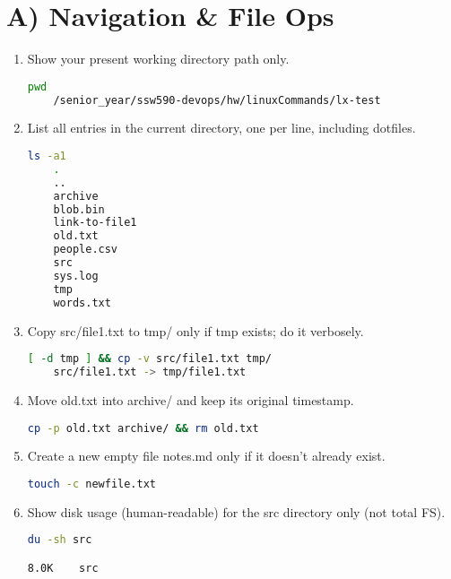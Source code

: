 \section*{A) Navigation \& File Ops}
\begin{enumerate}
\item Show your present working directory path only. \vspace{2em}\\
\begin{lstlisting}[language=sh]
    pwd
    /senior_year/ssw590-devops/hw/linuxCommands/lx-test

\end{lstlisting}

\item List all entries in the current directory, one per line, including dotfiles. \vspace{2em}\\
\begin{lstlisting}[language=sh]
ls -a1
    .
    ..
    archive
    blob.bin
    link-to-file1
    old.txt
    people.csv
    src
    sys.log
    tmp
    words.txt

\end{lstlisting}

\item Copy src/file1.txt to tmp/ only if tmp exists; do it verbosely. \vspace{2em}\\
\begin{lstlisting}[language=sh]
[ -d tmp ] && cp -v src/file1.txt tmp/
    src/file1.txt -> tmp/file1.txt
\end{lstlisting}
\item Move old.txt into archive/ and keep its original timestamp. \vspace{2em}\\
\begin{lstlisting}[language=sh]
cp -p old.txt archive/ && rm old.txt

\end{lstlisting}
\item Create a new empty file notes.md only if it doesn’t already exist. \vspace{2em}\\
\begin{lstlisting}[language=sh]
touch -c newfile.txt

\end{lstlisting}
\item Show disk usage (human-readable) for the src directory only (not total FS). \vspace{2em}\\
\begin{lstlisting}[language=sh]
    du -sh src

8.0K	src
\end{lstlisting}
\end{enumerate}

